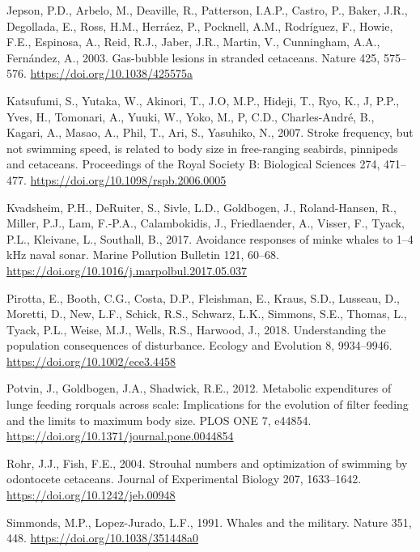 \documentclass[]{elsarticle} %
\begin{document}
\hypertarget{ref-jepson_gas-bubble_2003}{}
Jepson, P.D., Arbelo, M., Deaville, R., Patterson, I.A.P., Castro, P.,
Baker, J.R., Degollada, E., Ross, H.M., Herráez, P., Pocknell, A.M.,
Rodríguez, F., Howie, F.E., Espinosa, A., Reid, R.J., Jaber, J.R.,
Martin, V., Cunningham, A.A., Fernández, A., 2003. Gas-bubble lesions in
stranded cetaceans. Nature 425, 575--576.
\url{https://doi.org/10.1038/425575a}

\hypertarget{ref-katsufumi_stroke_2007}{}
Katsufumi, S., Yutaka, W., Akinori, T., J.O, M.P., Hideji, T., Ryo, K.,
J, P.P., Yves, H., Tomonari, A., Yuuki, W., Yoko, M., P, C.D.,
Charles-André, B., Kagari, A., Masao, A., Phil, T., Ari, S., Yasuhiko,
N., 2007. Stroke frequency, but not swimming speed, is related to body
size in free-ranging seabirds, pinnipeds and cetaceans. Proceedings of
the Royal Society B: Biological Sciences 274, 471--477.
\url{https://doi.org/10.1098/rspb.2006.0005}

\hypertarget{ref-kvadsheim_avoidance_2017}{}
Kvadsheim, P.H., DeRuiter, S., Sivle, L.D., Goldbogen, J.,
Roland-Hansen, R., Miller, P.J., Lam, F.-P.A., Calambokidis, J.,
Friedlaender, A., Visser, F., Tyack, P.L., Kleivane, L., Southall, B.,
2017. Avoidance responses of minke whales to 1--4 kHz naval sonar.
Marine Pollution Bulletin 121, 60--68.
\url{https://doi.org/10.1016/j.marpolbul.2017.05.037}

\hypertarget{ref-pirotta_understanding_2018}{}
Pirotta, E., Booth, C.G., Costa, D.P., Fleishman, E., Kraus, S.D.,
Lusseau, D., Moretti, D., New, L.F., Schick, R.S., Schwarz, L.K.,
Simmons, S.E., Thomas, L., Tyack, P.L., Weise, M.J., Wells, R.S.,
Harwood, J., 2018. Understanding the population consequences of
disturbance. Ecology and Evolution 8, 9934--9946.
\url{https://doi.org/10.1002/ece3.4458}

\hypertarget{ref-potvin_metabolic_2012}{}
Potvin, J., Goldbogen, J.A., Shadwick, R.E., 2012. Metabolic
expenditures of lunge feeding rorquals across scale: Implications for
the evolution of filter feeding and the limits to maximum body size.
PLOS ONE 7, e44854. \url{https://doi.org/10.1371/journal.pone.0044854}

\hypertarget{ref-rohr_strouhal_2004}{}
Rohr, J.J., Fish, F.E., 2004. Strouhal numbers and optimization of
swimming by odontocete cetaceans. Journal of Experimental Biology 207,
1633--1642. \url{https://doi.org/10.1242/jeb.00948}

\hypertarget{ref-simmonds_whales_1991}{}
Simmonds, M.P., Lopez-Jurado, L.F., 1991. Whales and the military.
Nature 351, 448. \url{https://doi.org/10.1038/351448a0}
\end{document}
